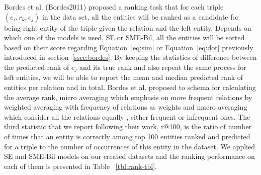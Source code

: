 Bordes et al. (Bordes2011) proposed a ranking task that for each triple $(e_{i} , r_{k}, e_{j} )$ in the data set,
 all the entities will be ranked as a candidate for being right entity of the triple 
 given the relation and the left entity. Depends on which one of the models is used, SE or SME-Bil, all the entities will be sorted
  based on their score regarding Equation~\eqref{eq:sim} or Equation~\ref{eq:dot} previously introduced in section~\ref{ssec:bordes}. 
  By keeping the statistics of difference between the predicted rank of $e_{j}$ and its true rank and also repeat the same process
  for left entities, we will be able to report the mean and median predicted rank of entities per relation and in total. Bordes et al.
   proposed to schema for calculating the average rank, micro averaging which emphasis on more frequent relations by
    weighted averaging with frequency of relations as weights and macro averaging which consider all the relations equally
    , either frequent or infrequent ones. The third statistic that we report following their work, r@100, is the ratio of number of times that 
    an entity is correctly among top 100 entities ranked and predicted for a triple to the number of occurrences of this entity in the dataset.
    We applied SE and SME-Bil models on our created datasets and the ranking performance on each of them is presented in Table ~\ref{tbl:rank-tbl}.
	
